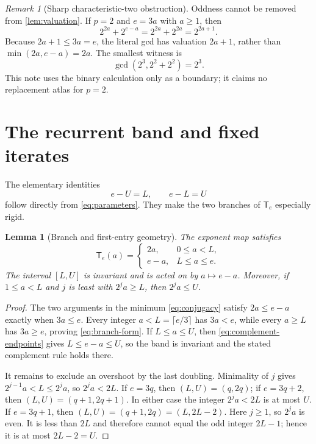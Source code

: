 \documentclass[10pt,a4paper]{amsart}
\newtheorem{lemma}[theorem]{Lemma}
\theoremstyle{definition}
\theoremstyle{remark}
\newtheorem{remark}[theorem]{Remark}
\newcommand{\T}{\mathsf T}
\begin{document}
\begin{remark}[Sharp characteristic-two obstruction]\label{rem:binary}
Oddness cannot be removed from \cref{lem:valuation}.  If $p=2$ and $e=3a$
with $a\geq1$, then
\[
 2^{2a}+2^{e-a}=2^{2a}+2^{2a}=2^{2a+1}.
\]
Because $2a+1\leq3a=e$, the literal gcd has valuation $2a+1$, rather than
$\min(2a,e-a)=2a$.  The smallest witness is
\[
 \gcd(2^3,2^2+2^2)=2^3.
\]
This note uses the binary calculation only as a boundary; it claims no
replacement atlas for $p=2$.
\end{remark}

\section{The recurrent band and fixed iterates}

The elementary identities
\begin{equation}\label{eq:complement-endpoints}
 e-U=L,\qquad e-L=U
\end{equation}
follow directly from \eqref{eq:parameters}.  They make the two branches of
$\T_e$ especially rigid.

\begin{lemma}[Branch and first-entry geometry]\label{lem:branches}
The exponent map satisfies
\begin{equation}\label{eq:branch-form}
 \T_e(a)=
 \begin{cases}
 2a,&0\leq a<L,\\
 e-a,&L\leq a\leq e.
 \end{cases}
\end{equation}
The interval $[L,U]$ is invariant and is acted on by $a\mapsto e-a$.
Moreover, if $1\leq a<L$ and $j$ is least with $2^ja\geq L$, then
$2^ja\leq U$.
\end{lemma}

\begin{proof}
The two arguments in the minimum \eqref{eq:conjugacy} satisfy
$2a\leq e-a$ exactly when $3a\leq e$.  Every integer $a<L=\lceil e/3\rceil$
has $3a<e$, while every $a\geq L$ has $3a\geq e$, proving
\eqref{eq:branch-form}.  If $L\leq a\leq U$, then
\eqref{eq:complement-endpoints} gives $L\leq e-a\leq U$, so the band is
invariant and the stated complement rule holds there.

It remains to exclude an overshoot by the last doubling.  Minimality of $j$
gives $2^{j-1}a<L\leq2^ja$, so $2^ja<2L$.  If $e=3q$, then
$(L,U)=(q,2q)$; if $e=3q+2$, then $(L,U)=(q+1,2q+1)$.  In either case the
integer $2^ja<2L$ is at most $U$.  If $e=3q+1$, then
$(L,U)=(q+1,2q)= (L,2L-2)$.  Here $j\geq1$, so $2^ja$ is even.  It is less
than $2L$ and therefore cannot equal the odd integer $2L-1$; hence it is at
most $2L-2=U$.
\end{proof}
\end{document}
